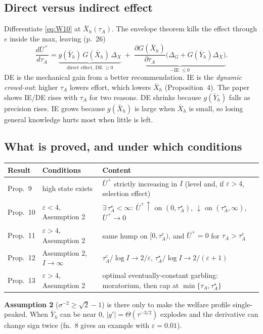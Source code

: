 \documentclass[11pt,a4paper]{article}
\theoremstyle{definition}
\theoremstyle{remark}
\newcommand{\tA}{\tau_A}
\begin{document}
\subsection{Direct versus indirect effect}
Differentiate \eqref{eq:W10} at $\bar X_h(\tA)$. The envelope theorem kills the effect through $e$ inside the
max, leaving (p.~26)
\[
\frac{d\bar U^+}{d\tA}=\underbrace{g(\bar Y_h)\,G(\bar X_h)\,\Delta_X}_{\text{direct effect, DE}\;\ge0}
\;+\;\underbrace{\frac{\partial G(\bar X_h)}{\partial\tA}\bigl(\Delta_G+G(\bar Y_h)\Delta_X\bigr)}_{-\text{IE}\;\le0}.
\]
DE is the mechanical gain from a better recommendation. IE is the \emph{dynamic crowd-out}: higher
$\tA$ lowers effort, which lowers $\bar X_h$ (Proposition~4). The paper shows IE/DE rises with $\tA$ for two
reasons. DE shrinks because $g(\bar Y_h)$ falls as precision rises. IE grows because $g(\bar X_h)$ is large
when $\bar X_h$ is small, so losing general knowledge hurts most when little is left.

\subsection{What is proved, and under which conditions}
\begin{center}\small
\begin{tabular}{@{}p{2.4cm}p{4.3cm}p{7.3cm}@{}}
\toprule
Result & Conditions & Content\\
\midrule
Prop.~9 & high state exists & $\bar U^+$ strictly increasing in $I$ (level and, if $\varepsilon>4$, selection effect)\\
Prop.~10 & $\varepsilon<4$, Assumption 2 & $\exists\,\tA^\star<\infty$: $\bar U^+\uparrow$ on $(0,\tA^\star)$, $\downarrow$ on $(\tA^\star,\infty)$, $\bar U^+\to0$\\
Prop.~11 & $\varepsilon>4$, Assumption 2 & same hump on $[0,\tA^c)$, and $\bar U^+=0$ for $\tA>\tA^c$\\
Prop.~12 & Assumption 2, $I\to\infty$ & $\tA^c/\log I\to2/\varepsilon$, $\tA^\star/\log I\to2/(\varepsilon+1)$\\
Prop.~13 & $\varepsilon>4$, Assumption 2 & optimal eventually-constant garbling: moratorium, then cap at $\min\{\tA,\tA^\star\}$\\
\bottomrule
\end{tabular}
\end{center}
\textbf{Assumption 2} ($\sigma^{-2}\ge\sqrt2-1$) is there only to make the welfare profile single-peaked. When
$\bar Y_h$ can be near $0$, $|g'|=\Theta(\tau^{-3/2})$ explodes and the derivative can change sign twice
(fn.~8 gives an example with $\varepsilon=0.01$).
\end{document}
